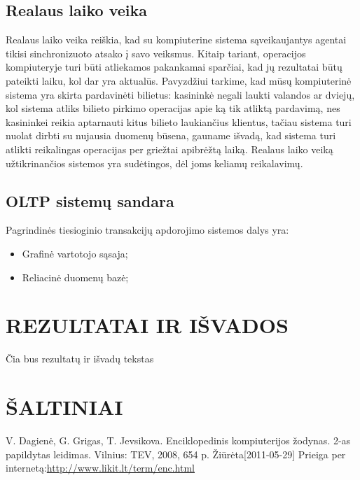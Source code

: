 \documentclass[12pt,a4paper,titlepage]{article}
\begin{document}
\subsection{Realaus laiko veika}
Realaus laiko veika reiškia, kad su kompiuterine sistema sąveikaujantys agentai tikisi sinchronizuoto atsako į savo veiksmus. Kitaip tariant, operacijos kompiuteryje turi būti atliekamos pakankamai sparčiai, kad jų rezultatai būtų pateikti laiku, kol dar yra aktualūs. Pavyzdžiui tarkime, kad mūsų kompiuterinė sistema yra skirta pardavinėti bilietus: kasininkė negali laukti valandos ar dviejų, kol sistema atliks bilieto pirkimo operacijas apie ką tik atliktą pardavimą, nes kasininkei reikia aptarnauti kitus bilieto laukiančius klientus, tačiau sistema turi nuolat dirbti su nujausia duomenų būsena, gauname išvadą, kad sistema turi atlikti reikalingas operacijas per griežtai apibrėžtą laiką. Realaus laiko veiką užtikrinančios sistemos yra sudėtingos, dėl joms keliamų reikalavimų.

\subsection{OLTP sistemų sandara}
Pagrindinės tiesioginio transakcijų apdorojimo sistemos dalys yra:
\begin{itemize}
	\item Grafinė vartotojo sąsaja;
	\item Reliacinė duomenų bazė;
\end{itemize}

\section*{REZULTATAI IR IŠVADOS}
Čia bus rezultatų ir išvadų tekstas

\section*{ŠALTINIAI}

\begin{thebibliography}{99}
V. Dagienė, G. Grigas, T. Jevsikova. Enciklopedinis kompiuterijos žodynas. 2-as papildytas leidimas. Vilnius: TEV, 2008, 654 p. Žiūrėta[2011-05-29] Prieiga per internetą:\url{http://www.likit.lt/term/enc.html}

\end{thebibliography}
\end{document}
